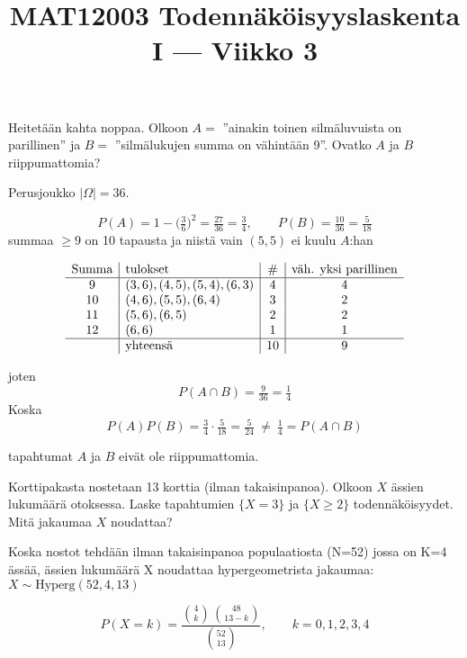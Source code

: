 \documentclass[12pt,a4paper]{article}
\title{MAT12003 Todennäköisyyslaskenta I — Viikko 3}
\date{}
\begin{document}
\maketitle

Heitetään kahta noppaa. Olkoon $A =$ ”ainakin toinen silmäluvuista on parillinen” ja $B =$ ”silmälukujen summa on vähintään 9”. Ovatko $A$ ja $B$ riippumattomia?


\vspace{0.4cm}


Perusjoukko $|\Omega|=36$.

\[
P(A)=1-\Big(\tfrac36\Big)^2=\tfrac{27}{36}=\tfrac34,\qquad
P(B)=\tfrac{10}{36}=\tfrac{5}{18}
\]
summaa $\ge 9$ on 10 tapausta ja niistä vain $(5,5)$ ei kuulu $A$:han

{\small
\[
\begin{array}{c|l|c|c}
\text{Summa} & \text{tulokset} & \# & \text{väh. yksi parillinen}\\
\hline
9  & (3,6),(4,5),(5,4),(6,3) & 4 & 4 \\
10 & (4,6),(5,5),(6,4)       & 3 & 2 \\
11 & (5,6),(6,5)             & 2 & 2 \\
12 & (6,6)                   & 1 & 1 \\
\hline
   & \text{yhteensä}         & 10& 9
\end{array}
\]}

joten
\[
P(A\cap B)=\tfrac{9}{36}=\tfrac14
\]
Koska
\[
P(A)P(B)=\tfrac34\cdot\tfrac{5}{18}=\tfrac{5}{24}\ \ne\ \tfrac14=P(A\cap B)
\]
\vspace{0.4cm}

tapahtumat $A$ ja $B$ eivät ole riippumattomia.







\pagebreak
{}
Korttipakasta nostetaan 13 korttia (ilman takaisinpanoa). Olkoon $X$ ässien lukumäärä otoksessa. Laske tapahtumien $\{X=3\}$ ja $\{X\ge 2\}$ todennäköisyydet. Mitä jakaumaa $X$ noudattaa?
\vspace{0.4cm}

Koska nostot tehdään ilman takaisinpanoa populaatiosta
(N=52) jossa on K=4 ässää, ässien lukumäärä X noudattaa
hypergeometrista jakaumaa: $X\sim\mathrm{Hyperg}(52,4,13)$
\vspace{0.4cm}

\[
P(X=k)=\frac{\binom{4}{k}\,\binom{48}{13-k}}
{\binom{52}{13}},\qquad k=0,1,2,3,4
\]
\end{document}
